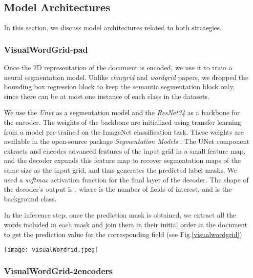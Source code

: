 \documentclass[conference]{IEEEtran}
\begin{document}
\subsection{Model Architectures}

In this section, we discuss model architectures related to both strategies.

\subsubsection{VisualWordGrid-pad}\hfill

Once the 2D representation of the document is encoded, we use it to train a neural segmentation model. Unlike \textit{chargrid} and \textit{wordgrid} papers, we dropped the bounding box regression block to keep the semantic segmentation block only, since there can be at most one instance of each class in the datasets. 

We use the \textit{Unet} \cite{unet} as a segmentation model and the \textit{ResNet34} \cite{resnet} as a backbone for the encoder. The weights of the backbone are initialized using transfer learning from a model pre-trained on the ImageNet classification task. These weights are available in the open-source package \textit{Segmentation Models} \cite{sm}. The UNet component extracts and encodes advanced features of the input grid in a small feature map, and the decoder expands this feature map to recover segmentation maps of the same size as the input grid, and thus generates the predicted label masks. We used a \textit{softmax} activation function for the final layer of the decoder. The shape of the decoder's output is , where  is the number of fields of interest, and  is the background class. 

In the inference step, once the prediction mask is obtained, we extract all the words included in each mask and join them in their initial order in the document to get the prediction value for the corresponding  field (see Fig.\ref{visualwordgrid})


\begin{figure*}

 \center

  \texttt{[image: visualWordrid.jpeg]}

  \caption{VisualWordGrid-pad pipeline.}

  \label{visualwordgrid}

\end{figure*}


\subsubsection{VisualWordGrid-2encoders}\hfill
\end{document}
